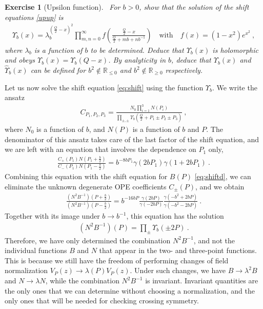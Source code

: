 \documentclass[12pt, a4paper]{article}
\theoremstyle{break}
\newtheorem{exo}{Exercise}[section]
\begin{document}
\begin{exo}[Upsilon function]
~\label{exo:upsilon}
 For $b>0$, show that the solution of the shift equations \eqref{upup} is 
 \begin{align}
 \Upsilon_b(x) = \lambda_b^{(\frac{Q}{2}-x)^2}\prod_{m,n=0}^\infty f\left(\frac{\frac{Q}{2}-x}{\frac{Q}{2}+mb+nb^{-1}}\right) \quad \text{with} \quad f(x)=(1-x^2)e^{x^2}\ ,
 \label{eq:up}
\end{align}
 where $\lambda_b$ is a function of $b$ to be determined. Deduce that $\Upsilon_b(x)$ is holomorphic and obeys $\Upsilon_b(x)=\Upsilon_b(Q-x)$. By analyticity in $b$, deduce that $\Upsilon_b(x)$ and $\hat\Upsilon_b(x)$ can be defined for $b^2\notin \mathbb{R}_{\leq 0}$ and $b^2\notin \mathbb{R}_{\geq 0}$ respectively.
\end{exo}
Let us now solve the shift equation \eqref{eq:shift} using the function $\Upsilon_b$. We write the ansatz
\begin{align}
 C_{P_1,P_2,P_3} =  \frac{N_0 \prod_{i=1}^3 N(P_i)}{\prod_{\pm,\pm} \Upsilon_b\left(\tfrac{Q}{2}+P_1\pm P_2 \pm P_3\right)} \ ,
 \label{cppp}
\end{align}
where $N_0$ is a function of $b$, and $N(P)$ is a function of $b$ and $P$. 
The denominator of this ansatz takes care of the last factor of the shift equation, and we are left with an equation that involves the dependence on $P_1$ only, 
\begin{align}
 \frac{C_+(P_1) N(P_1+\frac{b}{2})}{C_-(P_1) N(P_1-\frac{b}{2}) } 
 =b^{-8bP_1}\gamma(2bP_1) \gamma(1+2bP_1) \ .
\end{align}
Combining this equation with the shift equation for $B(P)$ \eqref{eq:shiftd}, we can eliminate the unknown degenerate OPE coefficients $C_\pm(P)$, and we obtain
\begin{align}
 \frac{\left(N^2B^{-1}\right)(P+\frac{b}{2})}{\left(N^2B^{-1}\right)(P-\frac{b}{2})} = b^{-16bP} \frac{\gamma(2bP)}{\gamma(-2bP)} \frac{\gamma(-b^2+2bP)}{\gamma(-b^2-2bP)}\ .
 \label{nbs}
\end{align}
Together with its image under $b\to b^{-1}$, this equation has the solution
\begin{align}
 \left(N^2B^{-1}\right)(P) = \prod_\pm \Upsilon_b(\pm 2P)\ .
 \label{eq:ntbm}
\end{align}
Therefore, we have only determined the combination $N^2B^{-1}$, and not the individual functions $B$ and $N$ that appear in the two- and three-point functions. This is because we still have the freedom of performing changes of field normalization $V_P(z) \to \lambda(P)V_P(z)$. Under such changes, we have $B\to \lambda^2B$ and $N\to \lambda N$, while
the combination $N^2B^{-1}$ is invariant. Invariant quantities are the only ones that we can determine without choosing a normalization, and the only ones that will be needed for checking crossing symmetry. 
\end{document}
